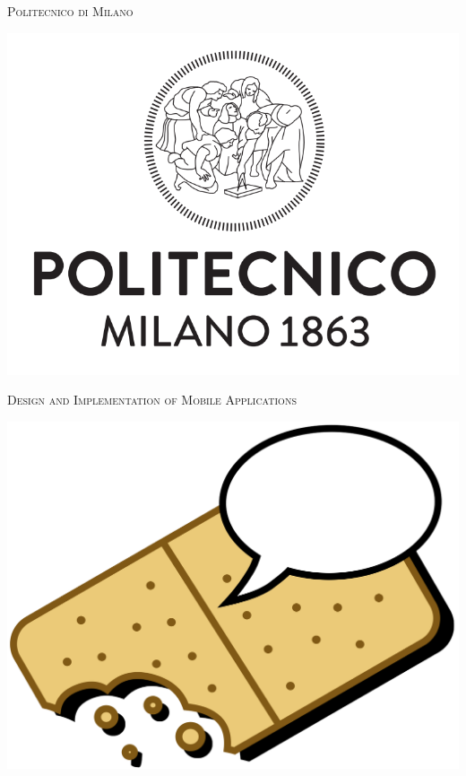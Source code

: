 




\begin{titlepage}


\begin{center}

{\Large{\scshape{Politecnico di Milano}}}
\vspace{6mm}

\includegraphics[scale=0.2]{img/polimi}
\vspace{6mm}

{\Large{\scshape{Design and Implementation of Mobile Applications}}}
\vspace{20mm}

\includegraphics[scale=0.5]{img/logo}
\vspace{8mm}


\end{center}
\end{titlepage}
